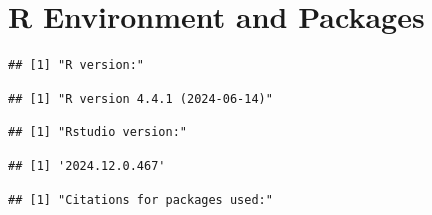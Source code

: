\documentclass[a4paper, nobind]{templates/ociamthesis}
\begin{document}
\renewcommand*{\arraystretch}{1}

\newpage

\chapter{R Environment and Packages}\label{r-environment-and-packages}

\begin{verbatim}
## [1] "R version:"
\end{verbatim}

\begin{verbatim}
## [1] "R version 4.4.1 (2024-06-14)"
\end{verbatim}

\begin{verbatim}
## [1] "Rstudio version:"
\end{verbatim}

\begin{verbatim}
## [1] '2024.12.0.467'
\end{verbatim}

\begin{verbatim}
## [1] "Citations for packages used:"
\end{verbatim}
\end{document}
